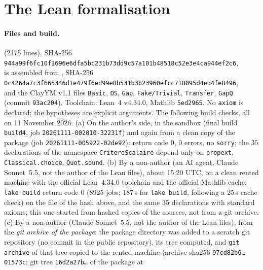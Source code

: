 \documentclass[11pt,a4paper]{article}
\theoremstyle{plain}
\theoremstyle{definition}
\theoremstyle{remark}
\numberwithin{equation}{section}
\newcommand{\REBUILDJOB}{20261111-005922-02de92}
\begin{document}
\appendix
\section{The Lean formalisation}\label{app:lean}
\paragraph{Files and build.}  (2175 lines), SHA-256\\
{\footnotesize\texttt{944a99f6fc10f1696e6dfa5bc231b73dd9c57a101b48518c52e3e4ca944ef2c6}},\\
is assembled from , SHA-256\\
{\footnotesize\texttt{0c4264a7c3f665346d1e479f6ed99e8b531b3b23960efcc718095d4ed4fe8496}},\\
and the ClayYM v1.1 files \texttt{Basic}, \texttt{OS}, \texttt{Gap}, \texttt{Fake/Trivial}, \texttt{Transfer}, \texttt{GapQ} (commit
\texttt{93ac204}). Toolchain: Lean~4 v4.34.0, Mathlib \texttt{5ed2965}. No \texttt{axiom} is declared; the hypotheses are explicit arguments.
The following build checks, all on 11 November 2026. (a) On the author's side, in the sandbox (final build \texttt{build4}, job \texttt{20261111-002010-32231f}) and again
from a clean copy of the package (job \texttt{\REBUILDJOB}): return code $0$, $0$ errors, no \texttt{sorry}; the $35$ declarations of the namespace
\texttt{CritereScalaire} depend only on \texttt{propext}, \texttt{Classical.choice}, \texttt{Quot.sound}. (b) By a non-author (an AI agent, Claude
Sonnet~5.5, not the author of the Lean files), about 15:20 UTC, on a clean rented machine with the official Lean~4.34.0 toolchain and the
official Mathlib cache: \texttt{lake build} return code $0$ (8925 jobs; $187$\,s for \texttt{lake build}, following a $25$\,s cache check) on the file  of the hash above, and the same $35$
declarations with standard axioms; this one started from hashed copies of the sources, not from a git archive.
(c) By a non-author (Claude Sonnet~5.5, not the author of the Lean files), from the \emph{git archive of the package}: the package directory
 was added to a scratch git repository (no commit in the public repository), its tree computed, and
\texttt{git archive} of that tree copied to the rented machine (archive sha256 \texttt{97cd82b6\dots01573c}; git tree \texttt{16d2a27b\dots} of the package at
\end{document}
